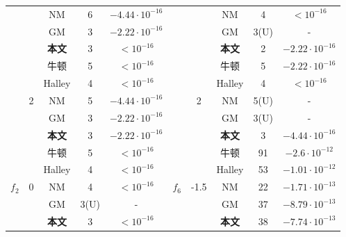 \begin{center}
\begin{longtable}[!htbp]{c|c|ccc|c|c|ccc}
        & 	   & 	NM  & 	6  & 	$-4.44 \cdot 10^{-16}$&	   & 	   & 	NM  & 	4  & 	$< 10^{-16}$\\
     
        & 	   & 	GM  & 	3  & 	$-2.22 \cdot 10^{-16}$&	   & 	   & 	GM  & 	3(U)  & 	$\text{-}$\\
     
        & 	   & 	\textbf{本文}  & 	3  & 	$< 10^{-16}$&	   & 	   & 	\textbf{本文}  & 	2  & 	$-2.22 \cdot 10^{-16}$\\
     
     \cline{2-5}\cline{7-10}
        & 	\multirow{5}{*}{2}  & 	牛顿  & 	5  & 	$< 10^{-16}$&	   & 	\multirow{5}{*}{2}  & 	牛顿  & 	5  & 	$-2.22 \cdot 10^{-16}$\\
     
        & 	   & 	Halley  & 	4  & 	$< 10^{-16}$&	   & 	   & 	Halley  & 	4  & 	$< 10^{-16}$\\
     
        & 	   & 	NM  & 	5  & 	$-4.44 \cdot 10^{-16}$&	   & 	   & 	NM  & 	5(U)  & 	$\text{-}$\\
     
        & 	   & 	GM  & 	3  & 	$-2.22 \cdot 10^{-16}$&	   & 	   & 	GM  & 	3(U)  & 	$\text{-}$\\
     
        & 	   & 	\textbf{本文}  & 	3  & 	$-2.22 \cdot 10^{-16}$&	   & 	   & 	\textbf{本文}  & 	3  & 	$-4.44 \cdot 10^{-16}$\\
     
     \cline{2-5}\cline{7-10}
     \hline


    \multirow{10}{*}{$f_2$} & 	\multirow{5}{*}{0}  & 	牛顿  & 	5  & 	$< 10^{-16}$&	\multirow{10}{*}{$f_6$}   & 	\multirow{5}{*}{-1.5}  & 	牛顿  & 	91  & 	$-2.6 \cdot 10^{-12}$\\

    & 	   & 	Halley  & 	4  & 	$< 10^{-16}$&	   & 	   & 	Halley  & 	53  & 	$-1.01 \cdot 10^{-12}$\\
 
    & 	   & 	NM  & 	4  & 	$< 10^{-16}$&	   & 	   & 	NM  & 	22  & 	$-1.71 \cdot 10^{-13}$\\
 
    & 	   & 	GM  & 	3(U)  & 	$\text{-}$&	   & 	   & 	GM  & 	37  & 	$-8.79 \cdot 10^{-13}$\\
 
    & 	   & 	\textbf{本文}  & 	3  & 	$< 10^{-16}$&	   & 	   & 	\textbf{本文}  & 	38  & 	$-7.74 \cdot 10^{-13}$\\
 

\end{longtable}
\end{center}
